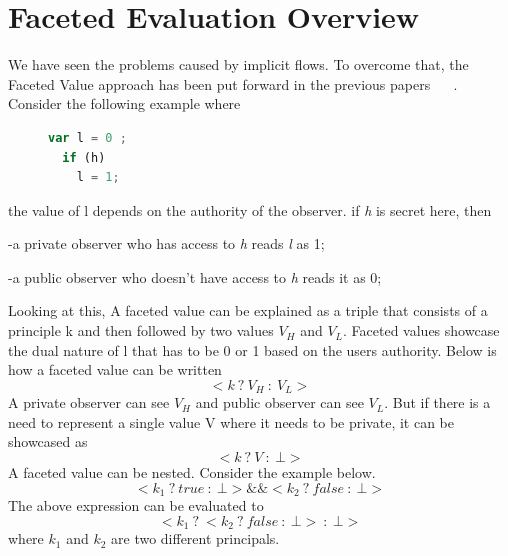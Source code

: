 \section{Faceted Evaluation Overview}
We have seen the problems caused by implicit flows. To overcome that, the Faceted Value approach has been put forward in the previous papers ~\cite{bib3} ~\cite{bib4}. Consider the following example where
\begin{figure}[h]
  \centering
\begin{lstlisting}[language=JavaScript, frame=none, numbers=none] 
 var l = 0 ;
  if (h) 
    l = 1;
\end{lstlisting}
\end{figure}
the value of l depends on the authority of the observer. if {\it h } is secret here, then  \par 
	-a private observer who has access to {\it h } reads {\it l } as 1; \par
	-a public observer who doesn't have access to {\it h } reads it as 0;\par
\noindent Looking at this, A faceted value can be explained as a triple that consists of a principle k and then followed by two values $V_{H}$ and $V_{L}$. Faceted values showcase the dual nature of l that has to be 0 or 1 based on the user\textquotesingle s authority. Below is how a faceted value can be written
$$
 <k\ ?\ V_{H}\ :\ V_{L}>
$$
A private observer can see $V_{H}$ and public observer can see $V_{L}$. But if there is a need to represent a single value V where it needs to be private, it can be showcased as
$$
 <k\ ?\ V\ :\ \bot>
$$
A faceted value can be nested. Consider the example below. 
$$
 <k_{1}\ ?\ true	\ :\ \bot> \&\& <k_{2}\ ?\ false\ :\ \bot>
$$
The above expression can be evaluated to 
$$
 <k_{1}\ ?\ <k_{2}\ ?\ false\ :\ \bot>\ :\ \bot>
$$
where $k_{1}$ and $k_{2}$ are two different principals.


